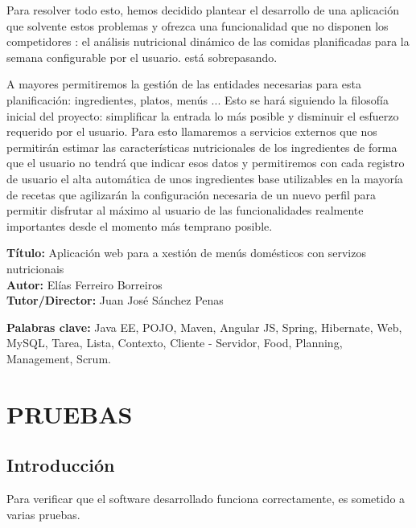 \documentclass[12pt, a4paper, twoside]{book}
\begin{document}
	Para resolver todo esto, hemos decidido plantear el desarrollo de una aplicación que solvente estos problemas y ofrezca una funcionalidad que no disponen los competidores : el análisis nutricional dinámico de las comidas planificadas para la semana configurable por el usuario. está sobrepasando.
	
	A mayores permitiremos la gestión de las entidades necesarias para esta planificación: ingredientes, platos, menús ... 
	Esto se hará siguiendo la filosofía inicial del proyecto: simplificar la entrada lo más posible y disminuir el esfuerzo requerido por el usuario. 
	Para esto llamaremos a servicios externos que nos permitirán estimar las características nutricionales de los ingredientes de forma que el usuario no tendrá que indicar esos datos y permitiremos con cada registro de usuario el alta automática de unos ingredientes base utilizables en la mayoría de recetas que agilizarán la configuración necesaria de un nuevo perfil para permitir disfrutar al máximo al usuario de las funcionalidades realmente importantes desde el momento más temprano posible.
	
	\clearpage
	
	\textbf{Título:} Aplicación web para a xestión de menús domésticos con servizos nutricionais
	\\
	\textbf{Autor:} Elías Ferreiro Borreiros
	\\
	\textbf{Tutor/Director:} Juan José Sánchez Penas
	
	
	\textbf{Palabras clave:} Java EE, POJO, Maven, Angular JS, Spring, Hibernate, Web, MySQL, Tarea, Lista, Contexto, Cliente - Servidor, Food, Planning, Management, Scrum. 
	
	
	\renewcommand{\contentsname}{Índice de contenidos}
	\renewcommand{\listfigurename}{Índice de figuras}
	\renewcommand{\listtablename}{Índice de tablas}
	
	\tableofcontents %
	
	\listoffigures %
	
	\listoftables %
	
	\clearpage
	
	\chapter{PRUEBAS}
	\section{Introducción}
	Para verificar que el software desarrollado funciona correctamente, es sometido a varias pruebas.
\end{document}
